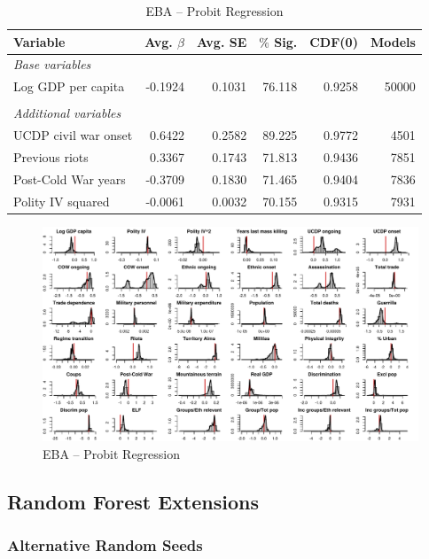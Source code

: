 \documentclass[a4paper,12pt]{article}
\begin{document}
\begin{table}[H]
\centering
\begin{tabular}{lrrrrr}
\hline
\textbf{Variable} & \textbf{Avg. $\beta$} & \textbf{Avg. SE} & \textbf{$\%$ Sig.} & \textbf{CDF(0)} & \textbf{Models} \\ \hline
\textit{Base variables} &  &  &  &  &  \\
Log GDP per capita & -0.1924 & 0.1031 & 76.118 & 0.9258 & 50000 \\
 &  &  &  &  &  \\
\textit{Additional variables} &  &  &  &  &  \\
UCDP civil war onset & 0.6422 & 0.2582 & 89.225 & 0.9772 & 4501 \\
Previous riots & 0.3367 & 0.1743 & 71.813 & 0.9436 & 7851 \\
Post-Cold War years & -0.3709 & 0.1830 & 71.465 & 0.9404 & 7836 \\
Polity IV squared & -0.0061 & 0.0032 & 70.155 & 0.9315 & 7931 \\ \hline
\end{tabular}
\caption{EBA -- Probit Regression}
\label{tab:eba1}
\end{table}

\clearpage
\begin{figure}
    \centering
    \includegraphics[width=\textwidth]{images/mk-probit.pdf}
    \caption{EBA -- Probit Regression}
    \label{fig:mk-probit}
\end{figure}
\clearpage

\subsection{Random Forest Extensions}
\label{sec:mk-rfe}

\subsubsection{Alternative Random Seeds}
\end{document}
